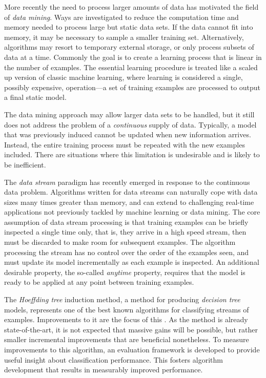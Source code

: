 More recently the need to process larger amounts of data has motivated the field of {\em data mining}. Ways are investigated to reduce the computation time and memory needed to process large but static data sets. If the data cannot fit into memory, it may be necessary to sample a smaller training set. Alternatively, algorithms may resort to temporary external storage, or only process subsets of data at a time. Commonly the goal is to create a learning process that is linear in the number of examples. The essential learning procedure is treated like a scaled up version of classic machine learning, where learning is considered a single, possibly expensive, operation---a set of training examples are processed to output a final static model.

The data mining approach may allow larger data sets to be handled, but it still does not address the problem of a {\em continuous} supply of data. Typically, a model that was previously induced cannot be updated when new information arrives. Instead, the entire training process must be repeated with the new examples included. There are situations where this limitation is undesirable and is likely to be inefficient.

The {\em data stream} paradigm has recently emerged in response to the continuous data problem. Algorithms written for data streams can naturally cope with data sizes many times greater than memory, and can extend to challenging real-time applications not previously tackled by machine learning or data mining. The core assumption of data stream processing is that training examples can be briefly inspected a single time only, that is, they arrive in a high speed stream, then must be discarded to make room for subsequent examples. The algorithm processing the stream has no control over the order of the examples seen, and must update its model incrementally as each example is inspected. An additional desirable property, the so-called {\em anytime} property, requires that the model is ready to be applied at any point between training examples.

\BEGINOMIT
The {\em Hoeffding tree} induction method, a method for producing {\em decision tree} models, represents one of the best known algorithms for classifying streams of examples. Improvements to it are the focus of this \thesis. As the method is already state-of-the-art, it is not expected that massive gains will be possible, but rather smaller incremental improvements that are beneficial nonetheless. To measure improvements to this algorithm, an evaluation framework is developed to provide useful insight about classification performance. This fosters algorithm development that results in measurably improved performance.
\ENDOMIT


